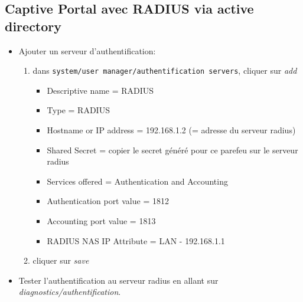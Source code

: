 \documentclass[a4paper]{article}
\begin{document}
\subsection{Captive Portal avec RADIUS via active directory}





\begin{itemize}

\item Ajouter un serveur d'authentification:
\begin{enumerate}
    \item dans \texttt{system/user manager/authentification servers}, cliquer sur \textit{add}
    \begin{itemize}
        \item Descriptive name = RADIUS
        \item Type = RADIUS
        \item Hostname or IP address = 192.168.1.2 (= adresse du serveur radius)
        \item Shared Secret = copier le secret généré pour ce parefeu sur le serveur radius
        \item Services offered = Authentication and Accounting
        \item Authentication port value = 1812
        \item Accounting port value = 1813
        \item RADIUS NAS IP Attribute = LAN - 192.168.1.1
    \end{itemize}
    \item cliquer sur \textit{save}
\end{enumerate}

\item Tester l'authentification au serveur radius en allant sur \textit{diagnostics/authentification}.


\end{itemize}
\end{document}
